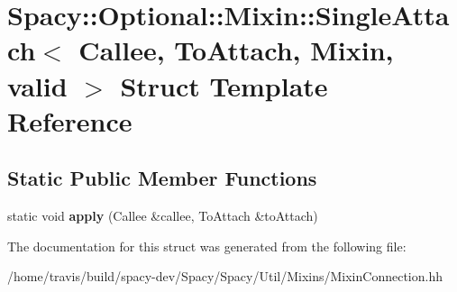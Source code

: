 \hypertarget{structSpacy_1_1Optional_1_1Mixin_1_1SingleAttach}{\section{Spacy\-:\-:Optional\-:\-:Mixin\-:\-:Single\-Attach$<$ Callee, To\-Attach, Mixin, valid $>$ Struct Template Reference}
\label{structSpacy_1_1Optional_1_1Mixin_1_1SingleAttach}
}
\subsection*{Static Public Member Functions}
\begin{DoxyCompactItemize}
\item 
\hypertarget{structSpacy_1_1Optional_1_1Mixin_1_1SingleAttach_a52061c5546bfd2d59ad15881dda8a01d}{static void {\bfseries apply} (Callee \&callee, To\-Attach \&to\-Attach)}\label{structSpacy_1_1Optional_1_1Mixin_1_1SingleAttach_a52061c5546bfd2d59ad15881dda8a01d}

\end{DoxyCompactItemize}


The documentation for this struct was generated from the following file\-:\begin{DoxyCompactItemize}
\item 
/home/travis/build/spacy-\/dev/\-Spacy/\-Spacy/\-Util/\-Mixins/Mixin\-Connection.\-hh\end{DoxyCompactItemize}
